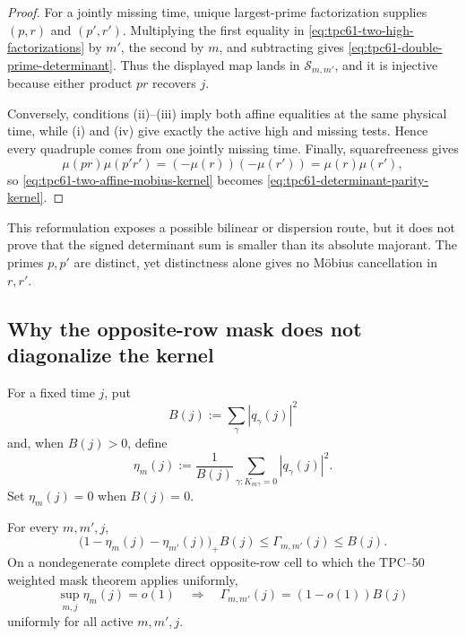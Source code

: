 \begin{proof}
For a jointly missing time, unique largest-prime factorization supplies
\((p,r)\) and \((p',r')\).  Multiplying the first equality in
\eqref{eq:tpc61-two-high-factorizations} by \(m'\), the second by \(m\),
and subtracting gives
\eqref{eq:tpc61-double-prime-determinant}.  Thus the displayed map lands
in \(\mathscr S_{m,m'}\), and it is injective because either product
\(pr\) recovers \(j\).

Conversely, conditions \textup{(ii)}--\textup{(iii)} imply both affine
equalities at the same physical time, while \textup{(i)} and \textup{(iv)}
give exactly the active high and missing
tests.  Hence every quadruple comes from one jointly missing time.  Finally,
squarefreeness gives
\[
 \mu(pr)\mu(p'r')
 =(-\mu(r))(-\mu(r'))
 =\mu(r)\mu(r'),
\]
so \eqref{eq:tpc61-two-affine-mobius-kernel} becomes
\eqref{eq:tpc61-determinant-parity-kernel}.
\end{proof}

This reformulation exposes a possible bilinear or dispersion route, but it
does not prove that the signed determinant sum is smaller than its absolute
majorant.  The primes \(p,p'\) are distinct, yet distinctness alone gives no
M\"obius cancellation in \(r,r'\).

\subsection{Why the opposite-row mask does not diagonalize the kernel}

For a fixed time \(j\), put
\begin{equation}
 B(j):=\sum_\gamma|q_\gamma(j)|^2
 \label{eq:tpc61-opposite-row-mass}
\end{equation}
and, when \(B(j)>0\), define
\begin{equation}
 \eta_m(j)
 :=\frac{1}{B(j)}
   \sum_{\gamma:K_{m\gamma}=0}|q_\gamma(j)|^2.
 \label{eq:tpc61-row-mask-defect}
\end{equation}
Set \(\eta_m(j)=0\) when \(B(j)=0\).

\begin{proposition}
\label{prop:tpc61-two-row-mask-overlap}
For every \(m,m',j\),
\begin{equation}
 \boxed{
 \bigl(1-\eta_m(j)-\eta_{m'}(j)\bigr)_+B(j)
 \le\Gamma_{m,m'}(j)\le B(j).}
 \label{eq:tpc61-two-row-mask-overlap-bound}
\end{equation}
On a nondegenerate complete direct opposite-row cell to which the
TPC--50 weighted mask theorem applies uniformly,
\begin{equation}
 \sup_{m,j}\eta_m(j)=o(1)
 \quad\Longrightarrow\quad
 \Gamma_{m,m'}(j)=(1-o(1))B(j)
 \label{eq:tpc61-mask-overlap-asymptotic}
\end{equation}
uniformly for all active \(m,m',j\).
\end{proposition}

